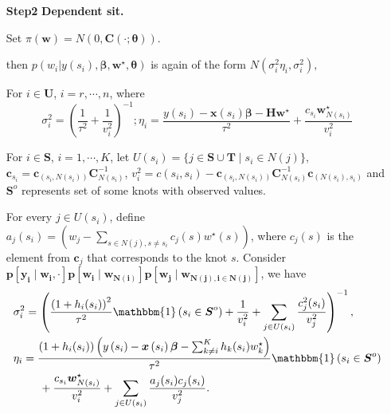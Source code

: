 \documentclass[
12pt, %
a4paper, %
oneside, %
headinclude,footinclude, %
BCOR5mm, %
]{scrartcl}
\begin{document}
\begin{itemize}
\begin{itemize}
 \item [\textbf{Step2}] \textbf{Dependent sit.}
 
Set \(\pi(\boldsymbol{w})=N\left(0, \boldsymbol{C}\left(\cdot; \boldsymbol{\theta}\right)\right).\)

then \(p(w_i | y\left(s_i\right), \boldsymbol{\beta}, \boldsymbol{w}^{\star}, \boldsymbol{\theta})\) is
again of the form \(N(\sigma_i^2 \eta_i, \sigma_i^2),\)

\textcolor[rgb]{0.60,0.80,0.20}{For $i \in \boldsymbol{U}$}, $i = r, \cdots, n$, where
\begin{equation}
\sigma_i^2 = \left(\frac{1}{\tau^2} + \frac{1}{v_i^2} \right)^{-1} ;
\eta_i = \frac{y\left(s_i\right) - \boldsymbol{x}\left(s_i\right)\boldsymbol{\beta} - \boldsymbol{H}\boldsymbol{w}^{\star}}{\tau^{2}} +  \frac{c_{s_i} \boldsymbol{w}^{\star}_{N(s_i)}}{v_i^2}
 \label{Eq:Post_W_Dis}
\end{equation}

\textcolor[rgb]{0.60,0.80,0.20}{For $i \in \boldsymbol{S}$}, $i = 1, \cdots, K$,  let $U(s_i) = \{j \in \boldsymbol{S} \cup \boldsymbol{T}\mid s_i \in N(j)\},$ $\boldsymbol{c}_{s_i} = \boldsymbol{c}_{\left(s_i, N(s_i)\right)}\boldsymbol{C}_{N(s_i)}^{-1}$, $v_i^2 = c(s_i, s_i) - \boldsymbol{c}_{\left(s_i, N(s_i)\right)}\boldsymbol{C}_{N(s_i)}^{-1}\boldsymbol{c}_{\left(N(s_i), s_i\right)}$ and $\boldsymbol{S}^{o}$ represents set of some knots with observed values.

For every $j \in U(s_i)$, define $a_{j}(s_i) = \left(w_j - \sum_{s \in N(j), s \neq s_i}{c_{j}(s)w^{\star}(s)}\right)$, where $c_{j}(s)$  is the element from $\boldsymbol{c}_{j}$ that corresponds to the knot $s$.
Consider $\boldsymbol{p\left[y_i\mid w_i, \cdot\right]p\left[w_i\mid w_{N(i)}\right]p\left[w_j\mid w_{N(j), i \in N(j)}\right]}$, we have
\begin{equation}
\begin{aligned}
&\sigma_i^2 = \left(\frac{\left(1 + h_i(s_i)\right)^2}{\tau^2}\mathbbm{1}\left(s_i \in \boldsymbol{S}^{o}\right) + \frac{1}{v_i^2} +
\sum_{j \in U(s_i)}\frac{c_{j}^2(s_i)}{v_j^2} \right)^{-1}, \\&
\eta_i = \frac{\left(1 + h_i(s_i)\right)\left(y\left(s_i\right) - \boldsymbol{x}\left(s_i\right)\boldsymbol{\beta} - \sum_{k \neq i}^{K}h_k(s_i)w_k^{\star}\right)}{\tau^{2}}\mathbbm{1}\left(s_i \in \boldsymbol{S}^{o}\right)\\& ~~~~~~~ + \frac{c_{s_i} \boldsymbol{w}_{N(s_i)}^{\star}}{v_i^2} + \sum_{j \in U(s_i)}\frac{a_{j}(s_i)c_j(s_i)}{v_j^2}.
\end{aligned}
 \label{Eq:Post_W_Dis}
\end{equation}


\end{itemize}
\end{itemize}
\end{document}
